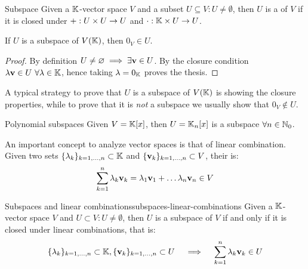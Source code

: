 \begin{definition}{Subspace}{}
  Given a $ \mathbb{K} $-vector space $ V $ and a subset $ U \subseteq V : U \neq \emptyset $, then $ U $ is a  of $ V $ if it is closed under $ + : U \times U \rightarrow U $ and $ \cdot : \mathbb{K} \times U \rightarrow U $.
\end{definition}

\begin{lemma}{}{}
  If $ U $ is a subspace of $ V(\mathbb{K}) $, then $ 0_V \in U $.
\end{lemma}

\begin{proofbox}
  \begin{proof}
    By definition $ U \neq \varnothing \implies \exists \mathbf{v} \in U $. By the closure condition $ \lambda \mathbf{v} \in U \,\,\forall \lambda \in \mathbb{K} $, hence taking $ \lambda = 0_{\mathbb{K}} $ proves the thesis.
  \end{proof}
\end{proofbox}

A typical strategy to prove that $ U $ is a subspace of $ V(\mathbb{K}) $ is showing the closure properties, while to prove that it is \emph{not} a subspace we usually show that $ 0_V \notin U $.

\begin{example}{Polynomial subspaces}{}
  Given $ V = \mathbb{K}[x] $, then $ U = \mathbb{K}_n[x] $ is a subspace $ \forall n \in \mathbb{N}_0 $.
\end{example}

An important concept to analyze vector spaces is that of linear combination. Given two sets $ \{\lambda_k\}_{k = 1, \dots, n} \subset \mathbb{K} $ and $ \{\mathbf{v}_k\}_{k = 1, \dots, n} \subset V $, their  is:
\begin{equation}
  \sum_{k = 1}^n \lambda_k \mathbf{v}_k = \lambda_1 \mathbf{v}_1 + \dots \lambda_n \mathbf{v}_n \in V
\end{equation}

\begin{proposition}{Subspaces and linear combinations}{subspaces-linear-combinations}
  Given a $ \mathbb{K} $-vector space $ V $ and $ U \subset V : U \neq \emptyset $, then $ U $ is a subspace of $ V $ if and only if it is closed under linear combinations, that is:
  \begin{equation*}
    \{\lambda_k\}_{k = 1, \dots, n} \subset \mathbb{K} , \{\mathbf{v}_k\}_{k = 1, \dots, n} \subset U
    \quad \implies \quad
    \sum_{k = 1}^n \lambda_k \mathbf{v}_k \in U
  \end{equation*}
\end{proposition}

